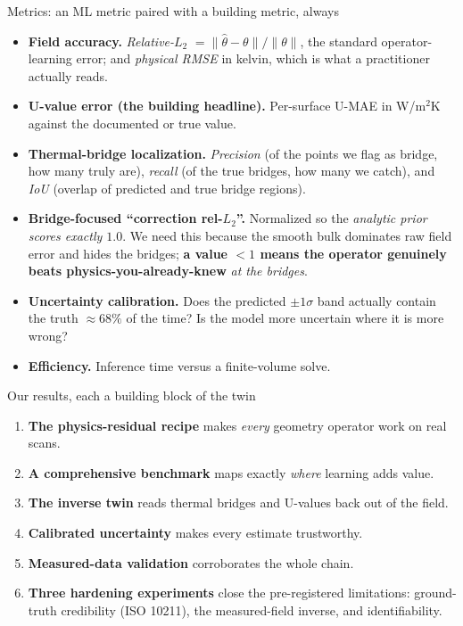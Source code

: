 \documentclass[aspectratio=169]{beamer}
\newcommand{\win}[1]{{\color{green!55!black}\textbf{#1}}}
\begin{document}
\begin{frame}{Metrics: an ML metric paired with a building metric, always}
  \small
  \begin{itemize}
    \item \textbf{Field accuracy.} \emph{Relative-$L_2$} $= \lVert\hat\theta-\theta\rVert/\lVert\theta\rVert$,
          the standard operator-learning error; and \emph{physical RMSE} in kelvin, which is what a
          practitioner actually reads.
    \item \textbf{U-value error (the building headline).} Per-surface U-MAE in W/m$^2$K against the
          documented or true value.
    \item \textbf{Thermal-bridge localization.} \emph{Precision} (of the points we flag as bridge, how
          many truly are), \emph{recall} (of the true bridges, how many we catch), and \emph{IoU}
          (overlap of predicted and true bridge regions).
    \item \textbf{Bridge-focused ``correction rel-$L_2$''.} Normalized so the \emph{analytic prior
          scores exactly $1.0$}. We need this because the smooth bulk dominates raw field error and
          hides the bridges; \win{a value $<1$ means the operator genuinely beats physics-you-already-knew}
          \emph{at the bridges}.
    \item \textbf{Uncertainty calibration.} Does the predicted $\pm1\sigma$ band actually contain the
          truth $\approx68\%$ of the time? Is the model more uncertain where it is more wrong?
    \item \textbf{Efficiency.} Inference time versus a finite-volume solve.
  \end{itemize}
\end{frame}

\begin{frame}{Our results, each a building block of the twin}
  \begin{enumerate}\small
    \item \win{The physics-residual recipe} makes \emph{every} geometry operator work on real scans.
    \item \win{A comprehensive benchmark} maps exactly \emph{where} learning adds value.
    \item \win{The inverse twin} reads thermal bridges and U-values back out of the field.
    \item \win{Calibrated uncertainty} makes every estimate trustworthy.
    \item \win{Measured-data validation} corroborates the whole chain.
    \item[6--8.] \win{Three hardening experiments} close the pre-registered limitations:
          ground-truth credibility (ISO 10211), the measured-field inverse, and identifiability.
  \end{enumerate}
\end{frame}
\end{document}

